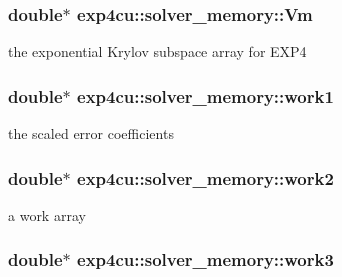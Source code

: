 \subsubsection[{\texorpdfstring{Vm}{Vm}}]{\setlength{\rightskip}{0pt plus 5cm}double$\ast$ exp4cu\+::solver\+\_\+memory\+::\+Vm}\hypertarget{structexp4cu_1_1solver__memory_a089d1909b39f39551063214762c66e08}{}\label{structexp4cu_1_1solver__memory_a089d1909b39f39551063214762c66e08}


the exponential Krylov subspace array for E\+X\+P4 

\subsubsection[{\texorpdfstring{work1}{work1}}]{\setlength{\rightskip}{0pt plus 5cm}double$\ast$ exp4cu\+::solver\+\_\+memory\+::work1}\hypertarget{structexp4cu_1_1solver__memory_aecfb53728ed87d6857212dd1e19345a8}{}\label{structexp4cu_1_1solver__memory_aecfb53728ed87d6857212dd1e19345a8}


the scaled error coefficients 

\subsubsection[{\texorpdfstring{work2}{work2}}]{\setlength{\rightskip}{0pt plus 5cm}double$\ast$ exp4cu\+::solver\+\_\+memory\+::work2}\hypertarget{structexp4cu_1_1solver__memory_a571d5da694382eb078504242f69c4b78}{}\label{structexp4cu_1_1solver__memory_a571d5da694382eb078504242f69c4b78}


a work array 

\subsubsection[{\texorpdfstring{work3}{work3}}]{\setlength{\rightskip}{0pt plus 5cm}double$\ast$ exp4cu\+::solver\+\_\+memory\+::work3}\hypertarget{structexp4cu_1_1solver__memory_a1798b2513a1d21e9beaa998f1dc1df89}{}\label{structexp4cu_1_1solver__memory_a1798b2513a1d21e9beaa998f1dc1df89}


